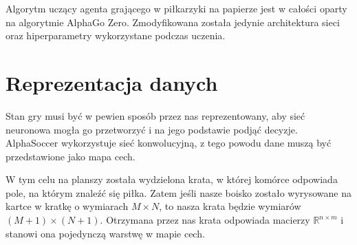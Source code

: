 \documentclass[licencjacka]{pracamgr}
\begin{document}
Algorytm uczący agenta grającego w piłkarzyki na papierze jest w całości oparty na algorytmie AlphaGo Zero. Zmodyfikowana została jedynie architektura sieci oraz hiperparametry wykorzystane podczas uczenia.


\section{Reprezentacja danych}

Stan gry musi być w pewien sposób przez nas reprezentowany, aby sieć neuronowa mogła go przetworzyć i na jego podstawie podjąć decyzje. AlphaSoccer wykorzystuje sieć konwolucyjną, z tego powodu dane muszą być przedstawione jako mapa cech. 

W tym celu na planszy została wydzielona krata, w której komórce odpowiada pole, na którym znaleźć się piłka. Zatem jeśli nasze boisko zostało wyrysowane na kartce w kratkę o wymiarach $M \times N$, to nasza krata będzie wymiarów $(M + 1) \times (N + 1)$. Otrzymana przez nas krata odpowiada macierzy $\mathbb{R}^{n \times m}$ i stanowi ona pojedynczą warstwę w mapie cech. 
\end{document}
